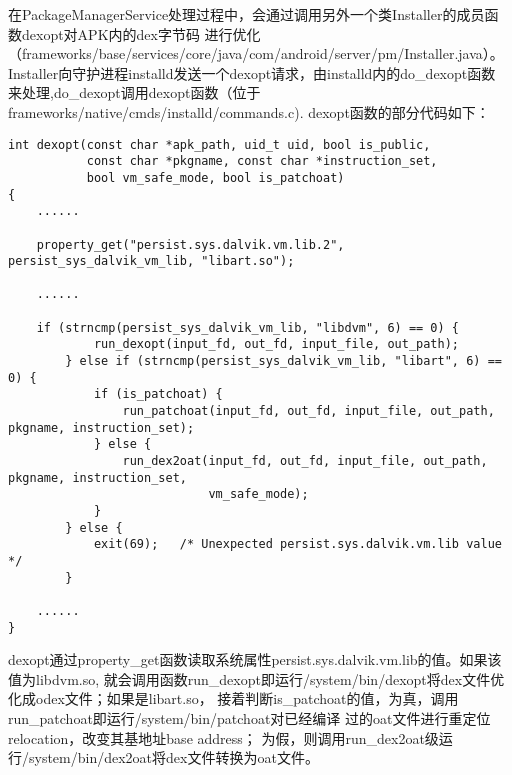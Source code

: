 在PackageManagerService处理过程中，会通过调用另外一个类Installer的成员函数dexopt对APK内的dex字节码
进行优化（frameworks/base/services/core/java/com/android/server/pm/Installer.java）。
Installer向守护进程installd发送一个dexopt请求，由installd内的do\_dexopt函数
来处理,do\_dexopt调用dexopt函数（位于frameworks/native/cmds/installd/commands.c).
dexopt函数的部分代码如下：
\begin{lstlisting}
int dexopt(const char *apk_path, uid_t uid, bool is_public,
           const char *pkgname, const char *instruction_set,
           bool vm_safe_mode, bool is_patchoat)
{
    ......

    property_get("persist.sys.dalvik.vm.lib.2", persist_sys_dalvik_vm_lib, "libart.so");

    ......

    if (strncmp(persist_sys_dalvik_vm_lib, "libdvm", 6) == 0) {
            run_dexopt(input_fd, out_fd, input_file, out_path);
        } else if (strncmp(persist_sys_dalvik_vm_lib, "libart", 6) == 0) {
            if (is_patchoat) {
                run_patchoat(input_fd, out_fd, input_file, out_path, pkgname, instruction_set);
            } else {
                run_dex2oat(input_fd, out_fd, input_file, out_path, pkgname, instruction_set,
                            vm_safe_mode);
            }
        } else {
            exit(69);   /* Unexpected persist.sys.dalvik.vm.lib value */
        }
     
    ......
}
\end{lstlisting}
dexopt通过property\_get函数读取系统属性persist.sys.dalvik.vm.lib的值。如果该值为libdvm.so,
就会调用函数run\_dexopt即运行/system/bin/dexopt将dex文件优化成odex文件；如果是libart.so，
接着判断is\_patchoat的值，为真，调用run\_patchoat即运行/system/bin/patchoat对已经编译
过的oat文件进行重定位relocation，改变其基地址base address；
为假，则调用run\_dex2oat级运行/system/bin/dex2oat将dex文件转换为oat文件。
